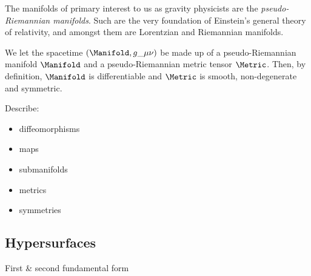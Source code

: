 









The manifolds of primary interest to us as gravity physicists are the \textit{pseudo-Riemannian manifolds}. Such are the very foundation of Einstein's general theory of relativity, and amongst them are Lorentzian and Riemannian manifolds.


We let the spacetime $(\Manifold, g\_{\mu\nu})$ be made up of a pseudo-Riemannian manifold $\Manifold$ and a pseudo-Riemannian metric tensor $\Metric$. Then, by definition, $\Manifold$ is differentiable and $\Metric$ is smooth, non-degenerate  and symmetric.




\begin{bullets}
    \item Describe:\begin{itemize}
        \item diffeomorphisms
        \item maps
        \item submanifolds
        \item metrics
        \item symmetries 
    \end{itemize}
\end{bullets}




\subsection{Hypersurfaces}
    \begin{bullets}
        \item First \& second fundamental form 
    \end{bullets}




    